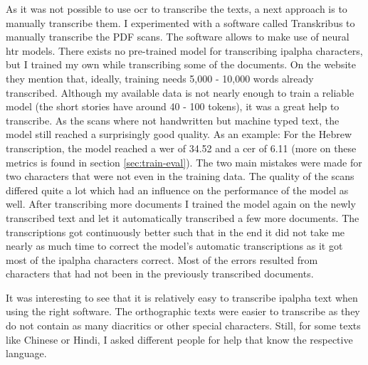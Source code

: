 As it was not possible to use \ac{ocr} to transcribe the texts, a next approach is to manually transcribe them. I experimented with a software called Transkribus to manually transcribe the PDF scans. The software allows to make use of neural \ac{htr} models. There exists no pre-trained model for transcribing \ac{ipalpha} characters, but I trained my own while transcribing some of the documents. On the website they mention that, ideally, training needs 5,000 - 10,000 words already transcribed. Although my available data is not nearly enough to train a reliable model (the short stories have around 40 - 100 tokens), it was a great help to transcribe. As the scans where not handwritten but machine typed text, the model still reached a surprisingly good quality. As an example: For the Hebrew transcription, the model reached a \ac{wer} of 34.52 and a \ac{cer} of 6.11 (more on these metrics is found in section \ref{sec:train-eval}). The two main mistakes were made for two characters that were not even in the training data. The quality of the scans differed quite a lot which had an influence on the performance of the model as well. After transcribing more documents I trained the model again on the newly transcribed text and let it automatically transcribed a few more documents. The transcriptions got continuously better such that in the end it did not take me nearly as much time to correct the model's automatic transcriptions as it got most of the \ac{ipalpha} characters correct. Most of the errors resulted from characters that had not been in the previously transcribed documents. 

It was interesting to see that it is relatively easy to transcribe \ac{ipalpha} text when using the right software. The orthographic texts were easier to transcribe as they do not contain as many diacritics or other special characters. Still, for some texts like Chinese or Hindi, I asked different people for help that know the respective language.


